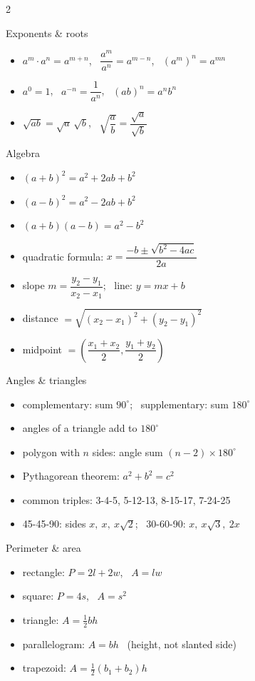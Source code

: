 {\begin{multicols}{2}
\begin{concept}{Exponents \& roots}
\begin{itemize}[leftmargin=1em]
\item $a^m \cdot a^n = a^{m+n}$, \ $\dfrac{a^m}{a^n} = a^{m-n}$, \ $(a^m)^n = a^{mn}$
\item $a^0 = 1$, \ $a^{-n} = \dfrac{1}{a^n}$, \ $(ab)^n = a^n b^n$
\item $\sqrt{ab} = \sqrt a\,\sqrt b$, \ $\sqrt{\dfrac ab} = \dfrac{\sqrt a}{\sqrt b}$
\end{itemize}
\end{concept}

\begin{concept}{Algebra}
\begin{itemize}[leftmargin=1em]
\item $(a+b)^2 = a^2 + 2ab + b^2$
\item $(a-b)^2 = a^2 - 2ab + b^2$
\item $(a+b)(a-b) = a^2 - b^2$
\item quadratic formula: $x = \dfrac{-b \pm \sqrt{b^2 - 4ac}}{2a}$
\item slope $m = \dfrac{y_2 - y_1}{x_2 - x_1}$; \ line: $y = mx + b$
\item distance $= \sqrt{(x_2-x_1)^2 + (y_2-y_1)^2}$
\item midpoint $= \left(\dfrac{x_1+x_2}{2}, \dfrac{y_1+y_2}{2}\right)$
\end{itemize}
\end{concept}

\begin{concept}{Angles \& triangles}
\begin{itemize}[leftmargin=1em]
\item complementary: sum $90^\circ$; \ supplementary: sum $180^\circ$
\item angles of a triangle add to $180^\circ$
\item polygon with $n$ sides: angle sum $(n-2)\times 180^\circ$
\item Pythagorean theorem: $a^2 + b^2 = c^2$
\item common triples: 3-4-5, 5-12-13, 8-15-17, 7-24-25
\item 45-45-90: sides $x,\ x,\ x\sqrt2$; \ 30-60-90: $x,\ x\sqrt3,\ 2x$
\end{itemize}
\end{concept}

\begin{concept}{Perimeter \& area}
\begin{itemize}[leftmargin=1em]
\item rectangle: $P = 2l + 2w$, \ $A = lw$
\item square: $P = 4s$, \ $A = s^2$
\item triangle: $A = \frac12 bh$
\item parallelogram: $A = bh$ \ (height, not slanted side)
\item trapezoid: $A = \frac12(b_1 + b_2)h$
\end{itemize}
\end{concept}


\end{multicols}}
